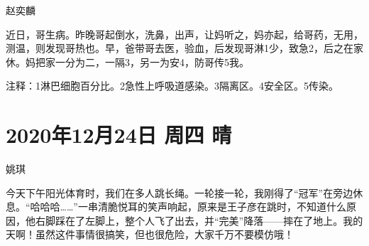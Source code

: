 赵奕麟

近日，哥生病。昨晚哥起倒水，洗鼻，出声，让妈听之，妈亦起，给哥药，无用，测温，则发现哥热也。早，爸带哥去医，验血，后发现哥淋1少，致急2，后之在家休。妈把家一分为二，一隔3，另一为安4，防哥传5我。

注释：1淋巴细胞百分比。2急性上呼吸道感染。3隔离区。4安全区。5传染。

\section{2020年12月24日 周四 晴}

姚琪

今天下午阳光体育时，我们在多人跳长绳。一轮接一轮，我刚得了``冠军''在旁边休息。``哈哈哈\ldots\ldots{}''一串清脆悦耳的笑声响起，原来是王子彦在跳时，不知道什么原因，他右脚踩在了左脚上，整个人飞了出去，并``完美''降落------摔在了地上。我的天啊！虽然这件事情很搞笑，但也很危险，大家千万不要模仿哦！
